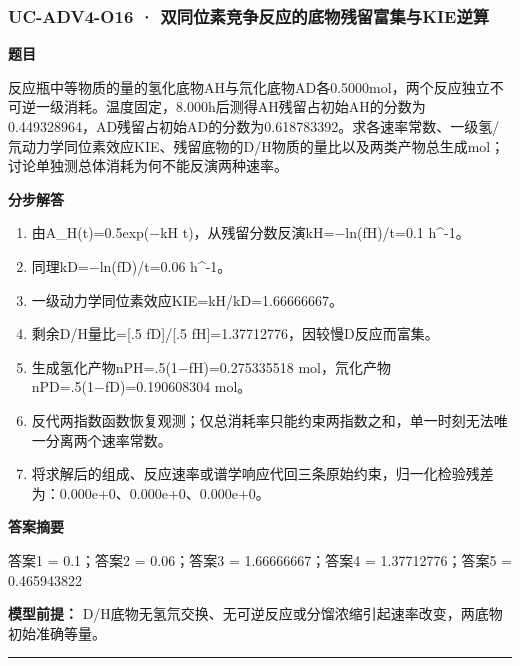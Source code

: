 \documentclass[UTF8,11pt,a4paper]{ctexart}
\begin{document}
\subsubsection*{UC-ADV4-O16 · 双同位素竞争反应的底物残留富集与KIE逆算}
\noindent\textbf{题目}\par
反应瓶中等物质的量的氢化底物AH与氘化底物AD各0.5000mol，两个反应独立不可逆一级消耗。温度固定，8.000h后测得AH残留占初始AH的分数为0.449328964，AD残留占初始AD的分数为0.618783392。求各速率常数、一级氢/氘动力学同位素效应KIE、残留底物的D/H物质的量比以及两类产物总生成mol；讨论单独测总体消耗为何不能反演两种速率。\par
\medskip\noindent\textbf{分步解答}
\begin{enumerate}
\item 由A\_H(t)=0.5exp(−kH t)，从残留分数反演kH=−ln(fH)/t=0.1 h\textasciicircum{}-1。
\item 同理kD=−ln(fD)/t=0.06 h\textasciicircum{}-1。
\item 一级动力学同位素效应KIE=kH/kD=1.66666667。
\item 剩余D/H量比=[.5 fD]/[.5 fH]=1.37712776，因较慢D反应而富集。
\item 生成氢化产物nPH=.5(1−fH)=0.275335518 mol，氘化产物nPD=.5(1−fD)=0.190608304 mol。
\item 反代两指数函数恢复观测；仅总消耗率只能约束两指数之和，单一时刻无法唯一分离两个速率常数。
\item 将求解后的组成、反应速率或谱学响应代回三条原始约束，归一化检验残差为：0.000e+0、0.000e+0、0.000e+0。
\end{enumerate}
\noindent\textbf{答案摘要}\par
答案1 = 0.1；答案2 = 0.06；答案3 = 1.66666667；答案4 = 1.37712776；答案5 = 0.465943822\par
\noindent\textbf{模型前提：}
D/H底物无氢氘交换、无可逆反应或分馏浓缩引起速率改变，两底物初始准确等量。\par
\medskip\hrule\medskip
{}
\end{document}
